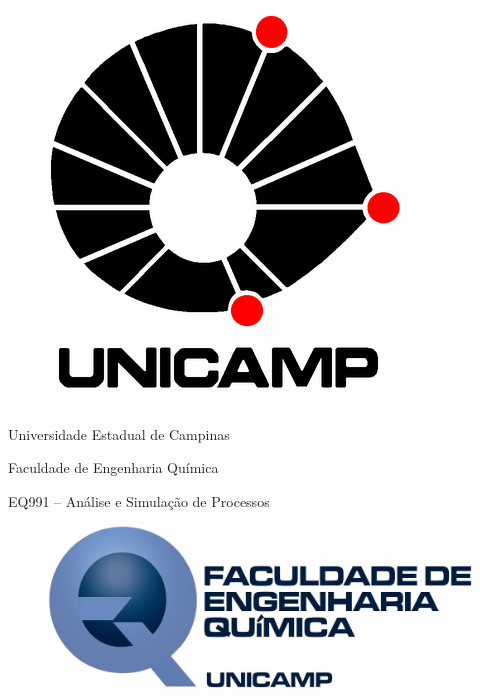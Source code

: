 
\begin{titlepage}
\begin{center}

\begin{minipage}{0.2\linewidth}
    \begin{flushleft}
        \begin{figure}[H]
    		\includegraphics[scale=0.21]{Imagens/LOGO-UNICAMP.png}
    	\end{figure}
    \end{flushleft}
\end{minipage}
\begin{minipage}{0.5\linewidth}
	\begin{center}
		
		Universidade Estadual de Campinas
		
		Faculdade de Engenharia Química
		
		EQ991 – Análise e Simulação de Processos
		
	\end{center}
\end{minipage}
\begin{minipage}{0.25\linewidth}
    \begin{flushleft}
        \begin{figure}[H]
    		\includegraphics[scale=0.3]{Imagens/LOGO-EQ.jpg}
    	\end{figure}
    \end{flushleft}
\end{minipage}


\end{center}
\end{titlepage}
